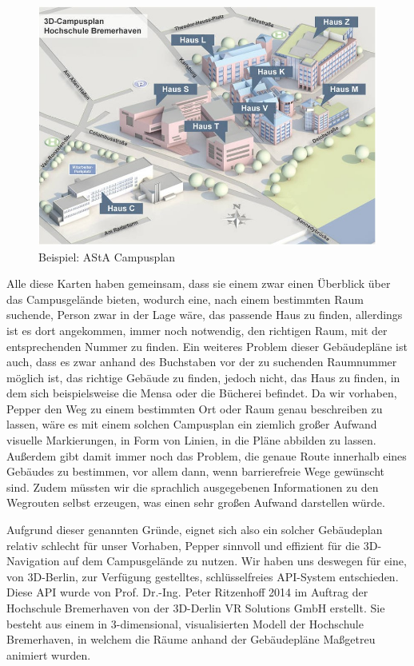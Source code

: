\begin{figure}[H]
    \includegraphics[width=\textwidth]{Figures/3DNavigator/asta_campusplan.jpg}
    \caption{Beispiel: AStA Campusplan}
    \label{fig:campusplan}
    \centering
\end{figure}

Alle diese Karten haben gemeinsam, dass sie einem zwar einen Überblick über das Campusgelände bieten, wodurch eine, nach einem bestimmten Raum suchende, Person zwar in der Lage wäre, das passende Haus zu finden, allerdings ist es dort angekommen, immer noch notwendig, den richtigen Raum, mit der entsprechenden Nummer zu finden. Ein weiteres Problem dieser Gebäudepläne ist auch, dass es zwar anhand des Buchstaben vor der zu suchenden Raumnummer möglich ist, das richtige Gebäude zu finden, jedoch nicht, das Haus zu finden, in dem sich beispielsweise die Mensa oder die Bücherei befindet. Da wir vorhaben, Pepper den Weg zu einem bestimmten Ort oder Raum genau beschreiben zu lassen, wäre es mit einem solchen Campusplan ein ziemlich großer Aufwand visuelle Markierungen, in Form von Linien, in die Pläne abbilden zu lassen. Außerdem gibt damit immer noch das Problem, die genaue Route innerhalb eines Gebäudes zu bestimmen, vor allem dann, wenn barrierefreie Wege gewünscht sind. Zudem müssten wir die sprachlich ausgegebenen Informationen zu den Wegrouten selbst erzeugen, was einen sehr großen Aufwand darstellen würde.

Aufgrund dieser genannten Gründe, eignet sich also ein solcher Gebäudeplan relativ schlecht für unser Vorhaben, Pepper sinnvoll und effizient für die 3D-Navigation auf dem Campusgelände zu nutzen. Wir haben uns deswegen für eine, von 3D-Berlin, zur Verfügung gestelltes, schlüsselfreies API-System entschieden. Diese API wurde von Prof. Dr.-Ing. Peter Ritzenhoff 2014 im Auftrag der Hochschule Bremerhaven von der 3D-Derlin VR Solutions GmbH erstellt. Sie besteht aus einem in 3-dimensional, visualisierten Modell der Hochschule Bremerhaven, in welchem die Räume anhand der Gebäudepläne Maßgetreu animiert wurden.\\

